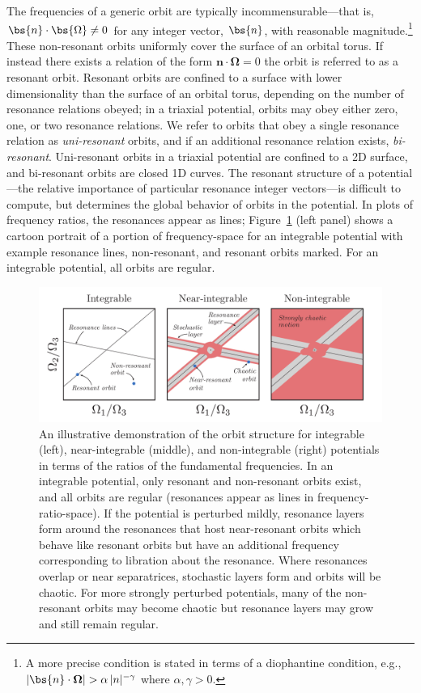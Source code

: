 The frequencies of a generic orbit are typically incommensurable---that is,
$\bs{n} \cdot \bs{\Omega} \neq 0$ for any integer vector, $\bs{n}$, with
reasonable magnitude.\footnote{A more precise condition is stated in terms of a
diophantine condition, e.g., $|\bs{n} \cdot \boldsymbol{\Omega}| > \alpha \,
|n|^{-\gamma}$ where $\alpha, \gamma>0$.} These non-resonant orbits uniformly
cover the surface of an orbital torus. If instead there exists a relation of the
form $\boldsymbol{n} \cdot \boldsymbol{\Omega} = 0$ the orbit is referred to as
a resonant orbit. Resonant orbits are confined to a surface with lower
dimensionality than the surface of an orbital torus, depending on the number of
resonance relations obeyed; in a triaxial potential, orbits may obey either
zero, one, or two resonance relations. We refer to orbits that obey a single
resonance relation as \emph{uni-resonant} orbits, and if an additional resonance
relation exists, \emph{bi-resonant}. Uni-resonant orbits in a triaxial potential
are confined to a 2D surface, and bi-resonant orbits are closed 1D curves. The
resonant structure of a potential---the relative importance of particular
resonance integer vectors---is difficult to compute, but determines the global
behavior of orbits in the potential. In plots of frequency ratios, the
resonances appear as lines; Figure~\ref{fig:cartoons} (left panel) shows a
cartoon portrait of a portion of frequency-space for an integrable potential
with example resonance lines, non-resonant, and resonant orbits marked. For an
integrable potential, all orbits are regular.

\begin{figure}[h]
\begin{center}
\includegraphics[width=\textwidth]{figures/ch3/cartoons.pdf}
\caption{An illustrative demonstration of the orbit structure for integrable
(left), near-integrable (middle), and non-integrable (right) potentials in terms
of the ratios of the fundamental frequencies. In an integrable potential, only
resonant and non-resonant orbits exist, and all orbits are regular (resonances
appear as lines in frequency-ratio-space). If the potential is perturbed mildly,
resonance layers form around the resonances that host near-resonant orbits which
behave like resonant orbits but have an additional frequency corresponding to
libration about the resonance. Where resonances overlap or near separatrices,
stochastic layers form and orbits will be chaotic. For more strongly perturbed
potentials, many of the non-resonant orbits may become chaotic but resonance
layers may grow and still remain regular. }
\label{fig:cartoons}
\end{center}
\end{figure}

